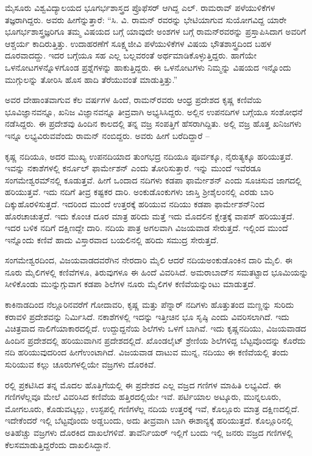 ಮೈಸೂರು ವಿಶ್ವವಿದ್ಯಾಲಯದ ಭೂಗರ್ಭಶಾಸ್ತ್ರದ ಪ್ರೊಫೆಸರ್‍ ಆಗಿದ್ದ ಎಲ್‍. ರಾಮರಾವ್‍ ಪಳೆಯುಳಿಕೆಗಳ ತಜ್ಞರಾಗಿದ್ದರು. ಅವರು ಹೀಗೆನ್ನುತ್ತಾರೆ: “ಸಿ. ವಿ. ರಾಮನ್‍ ರವರನ್ನು ಭೇಟಿಯಾಗುವ ಸುಯೋಗವಿದ್ದ ಯಾರೇ ಭೂಗರ್ಭಶಾಸ್ತ್ರಜ್ಞರಿಗೂ ತಮ್ಮ ವಿಷಯದ ಬಗ್ಗೆ ಯಾವುದೇ ಅಂಶಗಳ ಬಗ್ಗೆ ರಾಮನ್‍ರವರನ್ನು ಪ್ರಸ್ತಾಪಿಸಿದಾಗ ಅವರಿಗೆ ಆಶ್ಚರ್ಯ ಕಾದಿರುತ್ತಿತ್ತು. ಉದಾಹರಣೆಗೆ \enginline{--} ಸೂಕ್ಷ್ಮಜೀವಿ ಪಳೆಯುಳಿಕೆಗಳ ವಿಷಯ ಭೌತಶಾಸ್ತ್ರದಿಂದ ಬಹಳ ದೂರವಾದದ್ದು. ಇದರ ಬಗ್ಗೆಯೂ ಸಹ ಎಲ್ಲ ಬಲ್ಲವರಂತೆ ಅರ್ಥಮಾಡಿಕೊಳ್ಳುತ್ತಿದ್ದರು. ಹಾಗೆಯೇ ಒಳನೋಟಗಳನ್ನೊಳಗೊಂಡ ಪ್ರಶ್ನೆಗಳನ್ನು ಹಾಕುತ್ತಿದ್ದರು. ಈ ಒಳನೋಟಗಳು ನಿಮ್ಮನ್ನು ವಿಷಯದ ಇನ್ನೊಂದು ಮುಗ್ಗುಲನ್ನು ತೋರಿಸಿ ಹೊಸ ಹಾದಿ ತೆರೆಯುವಂತೆ ಮಾಡುತ್ತಿತ್ತು.”

\newpage

ಅವರ ದೇಹಾಂತವಾಗುವ ಕೆಲ ವರ್ಷಗಳ ಹಿಂದೆ, ರಾಮನ್‌ರವರು ಆಂಧ್ರ ಪ್ರದೇಶದ ಕೃಷ್ಣ ಕಣಿವೆಯ ಭೂವಿಜ್ಞಾನವನ್ನೂ, ಖನಿಜ ವಿಜ್ಞಾನವನ್ನೂ ತೀವ್ರವಾಗಿ ಅಭ್ಯಸಿಸಿದ್ದರು. ಅಲ್ಲಿನ ಉಪನದಿಗಳ ಬಗ್ಗೆಯೂ ಸಂಶೋಧನೆ ನಡೆಸಿದ್ದರು. ಈ ಪ್ರದೇಶವು ಹಿಂದಿನ ಕಾಲದಲ್ಲಿ ತನ್ನ ವಜ್ರ ಸಂಪತ್ತಿಗೆ ಹೆಸರಾಗಿದ್ದಿತು. ಅಲ್ಲಿ ವಜ್ರ ಹೊತ್ತ ಖನಿಜಗಳು ಇನ್ನೂ ಲಭ್ಯವಿರುವವೆಂದು ರಾಮನ್ ನಂಬಿದ್ದರು. ಅವರು ಹೀಗೆ ಬರೆದಿದ್ದಾರೆ –

ಕೃಷ್ಣ ನದಿಯೂ, ಅದರ ಮುಖ್ಯ ಉಪನದಿಯಾದ ತುಂಗಭದ್ರ ನದಿಯೂ ಪೂರ್ವಕ್ಕೂ, ನೈರುತ್ಯಕ್ಕೂ  ಹರಿಯುತ್ತವೆ. ಇವನ್ನು ನಕಾಶೆಗಳಲ್ಲಿ ಕರ್ನೂಲ್ ಫಾರ್ಮೇಶನ್ ಎಂದು ತೋರಿಸುತ್ತಾರೆ. ಇನ್ನು ಮುಂದೆ ಇವೆರಡೂ ಸಂಗಮೇಶ್ವರಮ್‍ನಲ್ಲಿ ಕೂಡುತ್ತವೆ. ಹೀಗೆ ಒಂದಾದ ನದಿಗಳು ಕಡಪಾ ಫಾರ್ಮೇಶನ್ ಎಂದು ಸೂಚಿಸುವ ಜಾಗದಲ್ಲಿ ಹರಿಯುತ್ತವೆ. ಇದು ನದಿಗೆ ತೀವ್ರ ಕಷ್ಟಕರ ದಾರಿ. ಅಂಕುಡೊಂಕುಗಳು ಜಾಸ್ತಿ ಶ‍್ರೀಶೈಲಂನಲ್ಲಿ ಎರಡು ಬಾರಿ ದಿಕ್ಕುಹೊರಳಿಸುತ್ತದೆ. ಇದರಿಂದ ಮುಂದೆ ಉತ್ತರಕ್ಕೆ ಹರಿಯುವ ನದಿಯು ಕಡಪಾ ಫಾರ್ಮೇಶನ್‌ನಿಂದ ಹೊರಚಾಚುತ್ತದೆ. ಇದು ಕೊಂಚ ದೂರ ಮಾತ್ರ ಹರಿದು ಮತ್ತೆ ಇದು ಮೊದಲಿನ ಕ್ಷೇತ್ರಕ್ಕೆ ವಾಪಸ್ ಹರಿಯುತ್ತದೆ. ಇದರ ಬಳಿಕ ನದಿಗೆ ದಕ್ಷಿಣದ್ದೇ ದಾರಿ. ನದಿಯ ಪಾತ್ರ ಅಗಲವಾಗಿ ವಿಜಯವಾಡ ಸೇರುತ್ತದೆ. ಇಲ್ಲಿಂದ ಮುಂದೆ ಇನ್ನೊಂದು ಕಣಿವೆ ಹಾದು ವಿಸ್ತಾರವಾದ ಬಯಲಿನಲ್ಲಿ ಹರಿದು ಸಮುದ್ರ ಸೇರುತ್ತದೆ.

ಸಂಗಮೇಶ್ವರದಿಂದ, ವಿಜಯವಾಡದವರೆಗಿನ ನೇರದಾರಿ  ಮೈಲಿ ಆದರೆ ನದಿಯ\break ಅಂಕುಡೊಂಕಿನ ದಾರಿ  ಮೈಲಿ. ಈ ನೂರು ಮೈಲಿಗಳಲ್ಲಿ ಕಣಿವೆಗಳೂ, ತಿರುವುಗಳೂ ಈ ಹಿಂದೆ ವಿವರಿಸಿದೆ. ಅಮರಾಬಾದ್‌ನ ಸಮತಟ್ಟಾದ ಭೂಮಿಯನ್ನು ಸೀಳಿಕೊಂಡು ಮುನ್ನುಗ್ಗುವಾಗ ಕಡಪಾ ಶಿಲೆಗಳ ನೂರು ಮೈಲಿಗಳ ಕಣಿವೆಯನ್ನುಂಟು ಮಾಡುತ್ತದೆ.

ಕಾಕಿನಾಡದಿಂದ ನೆಲ್ಲೂರಿನವರೆಗೆ ಗೋದಾವರಿ, ಕೃಷ್ಣ ಮತ್ತು ಪೆನ್ನಾರ್ ನದಿಗಳು ಹೊತ್ತುತಂದ ಮಣ್ಣನ್ನು ಸುರಿದು ಕರಾವಳಿ ಪ್ರದೇಶವನ್ನು ನಿರ್ಮಿಸಿದೆ. ನಕಾಶೆಗಳಲ್ಲಿ ಇದನ್ನು ಇತ್ತೀಚಿನ ಭೂ ಸೃಷ್ಠಿ ಎಂದು ವಿವರಿಸಲಾಗಿದೆ. ಇದು ವಿಚಿತ್ರವಾದ ನಾಲಿಗೆಯಾಕಾರದಲ್ಲಿದೆ. ಉದ್ದುದ್ದನೆಯ ಶಿಲೆಗಳು ಒಳಗೆ ಬಾಗಿವೆ. ಇದು ಕೃಷ್ಣನದಿಯು, ವಿಜಯವಾಡದ ಹಿಂದಿನ ಪ್ರದೇಶದಲ್ಲಿ ಹರಿಯುವಾಗಿನ ಪ್ರದೇಶದಲ್ಲಿದೆ. ಖೊಂಡಲೈಟ್ ಶ್ರೇಣಿಯ ಶಿಲೆಗಳಿದ್ದ ಬೆಟ್ಟವೊಂದನ್ನು ಕೊರೆದು ನದಿ ಹರಿಯುವುದ\-ರಿಂದ ಹೀಗೆಉಂಟಾಗಿದೆ. ವಿಜಯವಾಡ ದಾಟುವ ಮುನ್ನ, ನದಿಯು ಈ ಕಣಿವೆಯಲ್ಲಿ ತಂದು ಸುರಿಯುವ ಕಲ್ಲು ಚೂರುಗಳಲ್ಲಿಯೇ ವಜ್ರಗಳು ದೊರಕಿವೆ.

 ರಲ್ಲಿ  ಪ್ರಕಟಿಸಿದ ತನ್ನ ಮೊದಲ ಹೊತ್ತಿಗೆಯಲ್ಲಿ ಈ ಪ್ರದೇಶದ ಎಲ್ಲ ವಜ್ರದ ಗಣಿಗಳ ಮಾಹಿತಿ ಲಭ್ಯವಿದೆ. ಈ ಗಣಿಗಳೆಲ್ಲವೂ ಮೇಲೆ ವಿವರಿಸಿದ ಕಣಿವೆಯ ಹತ್ತಿರದಲ್ಲಿಯೇ ಇವೆ. ಪರ್ಟಿಯಾಲ ಅಟ್ಕೂರು, ಮುನ್ನಲೂರು, ಮೋಗಲೂರು, ಕೊಡುವಟ್ಕಲ್ಲು, ಉಸ್ಟಪಲ್ಲಿ ಗಣಿಗಳೆಲ್ಲ ನದಿಯ ಉತ್ತರಕ್ಕೆ ಇವೆ, ಕೊಲ್ಲೂರು ಮಾತ್ರ ದಕ್ಷಿಣದಲ್ಲಿದೆ. ಇದೇಕೆಂದರೆ ಇಲ್ಲಿ ಬೆಟ್ಟವೊಂದು ಅಡ್ಡಬಂದು, ಅದು ತೀವ್ರವಾಗಿ ಬಾಗಿ ಈಶಾನ್ಯಕ್ಕೆ ಹರಿಯುತ್ತದೆ. ಕೊಲ್ಲೂರಿನಲ್ಲಿ ಅತಿಹೆಚ್ಚು ವಜ್ರಗಳು ದೊರಕಿದ ದಾಖಲೆಗಳಿವೆ. ತಾವೆರ್ನಿಯರ್ ಇಲ್ಲಿಗೆ ಬಂದು ಇಲ್ಲಿ  ಜನರು ವಜ್ರದ ಗಣಿಗಳಲ್ಲಿ ಕೆಲಸಮಾಡುತ್ತಿದ್ದರೆಂದು ದಾಖಲಿಸಿದ್ದಾನೆ.

